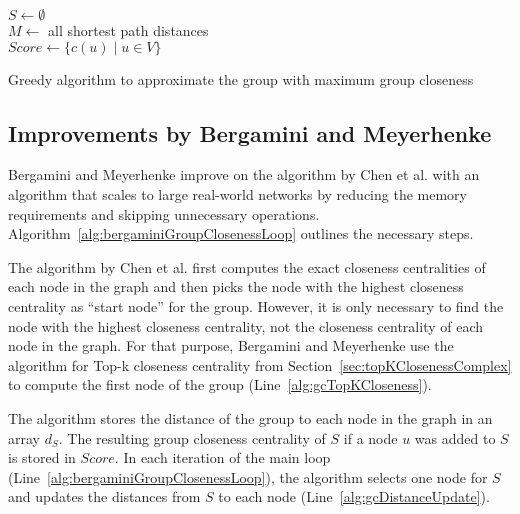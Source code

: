 \begin{algorithm2e}[h!]
  \label{alg:chenGroupCloseness}
 
  $S \gets \emptyset$ \\
  $M \gets $ all shortest path distances \\
  $Score \gets \{c(u) \mid u \in V\}$ \label{alg:initScore} \\
  \caption{Greedy algorithm to approximate the group with maximum group closeness}
\end{algorithm2e}

\subsection{Improvements by Bergamini and Meyerhenke}
Bergamini and Meyerhenke improve on the algorithm by Chen et al. with an algorithm that scales to large real-world networks by reducing the memory requirements and skipping unnecessary operations. Algorithm~\ref{alg:bergaminiGroupClosenessLoop} outlines the necessary steps.

The algorithm by Chen et al. first computes the exact closeness centralities of each node in the graph and then picks the node with the highest closeness centrality as ``start node'' for the group. However, it is only necessary to find the node with the highest closeness centrality, not the closeness centrality of each node in the graph. For that purpose, Bergamini and Meyerhenke use the algorithm for Top-k closeness centrality from Section~\ref{sec:topKClosenessComplex} to compute the first node of the group (Line~\ref{alg:gcTopKCloseness}).

The algorithm stores the distance of the group to each node in the graph in an array $d_S$. The resulting group closeness centrality of $S$ if a node $u$ was added to $S$ is stored in $Score$. In each iteration of the main loop (Line~\ref{alg:bergaminiGroupClosenessLoop}), the algorithm selects one node for $S$ and updates the distances from $S$ to each node (Line~\ref{alg:gcDistanceUpdate}).

